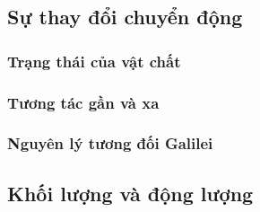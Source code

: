 \subsection{Sự thay đổi chuyển động}
\begin{frame}
\frametitle{Trạng thái của vật chất}
\end{frame}
\begin{frame}
\frametitle{Tương tác gần và xa}
\end{frame}
\begin{frame}
    \frametitle{Nguyên lý tương đối Galilei}
\end{frame}
\subsection{Khối lượng và động lượng}